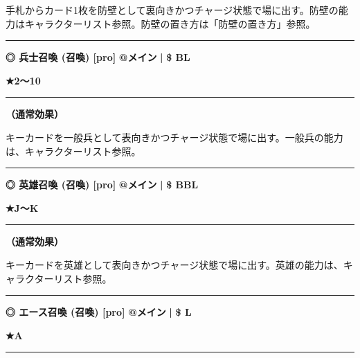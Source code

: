 \documentclass[twocolumn,a5paper,papersize,10pt]{jarticle}
\begin{document}
手札からカード1枚を防壁として裏向きかつチャージ状態で場に出す。防壁の能力はキャラクターリスト参照。防壁の置き方は「防壁の置き方」参照。
\vspace{2mm} %
\hrule height 0.5mm depth 0mm width 66.5mm %
\vspace{1mm} %
{\small\bf ◎ 兵士召喚 {\scriptsize (召喚) [pro]}} %
\hfill 
{\footnotesize\bf @メイン }
  {\footnotesize\bf | } {\footnotesize\bf \$ BL}

{\footnotesize\bf ★2〜10}

\vspace{1mm}%
\hrule height 0.1mm depth 0mm width 66.5mm %
\vspace{1mm}%

{\bf（通常効果）}

キーカードを一般兵として表向きかつチャージ状態で場に出す。一般兵の能力は、キャラクターリスト参照。
\vspace{2mm} %
\hrule height 0.5mm depth 0mm width 66.5mm %
\vspace{1mm} %
{\small\bf ◎ 英雄召喚 {\scriptsize (召喚) [pro]}} %
\hfill 
{\footnotesize\bf @メイン }
  {\footnotesize\bf | } {\footnotesize\bf \$ BBL}

{\footnotesize\bf ★J〜K}

\vspace{1mm}%
\hrule height 0.1mm depth 0mm width 66.5mm %
\vspace{1mm}%

{\bf（通常効果）}

キーカードを英雄として表向きかつチャージ状態で場に出す。英雄の能力は、キャラクターリスト参照。
\vspace{2mm} %
\hrule height 0.5mm depth 0mm width 66.5mm %
\vspace{1mm} %
{\small\bf ◎ エース召喚 {\scriptsize (召喚) [pro]}} %
\hfill 
{\footnotesize\bf @メイン }
  {\footnotesize\bf | } {\footnotesize\bf \$ L}

{\footnotesize\bf ★A}

\vspace{1mm}%
\hrule height 0.1mm depth 0mm width 66.5mm %
\vspace{1mm}%
\end{document}
